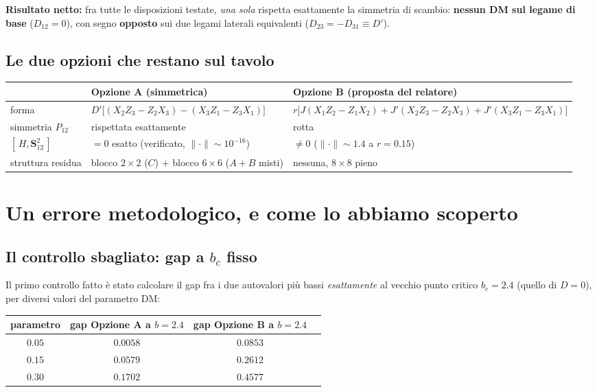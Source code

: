 \documentclass[11pt,a4paper]{article}
\begin{document}
\textbf{Risultato netto:} fra tutte le disposizioni testate, \emph{una sola} rispetta
esattamente la simmetria di scambio: \textbf{nessun DM sul legame di base}
($D_{12}=0$), con segno \textbf{opposto} sui due legami laterali equivalenti
($D_{23}=-D_{31}\equiv D'$).

\subsection{Le due opzioni che restano sul tavolo}

\begin{center}
\renewcommand{\arraystretch}{1.4}
\begin{tabular}{@{}p{2.3cm}p{6.3cm}p{6.3cm}@{}}
\toprule
& \textbf{Opzione A} (simmetrica) & \textbf{Opzione B} (proposta del relatore) \\
\midrule
forma & $D'\big[(X_2Z_3{-}Z_2X_3)-(X_3Z_1{-}Z_3X_1)\big]$ &
$r\big[J(X_1Z_2{-}Z_1X_2)+J'(X_2Z_3{-}Z_2X_3)+J'(X_3Z_1{-}Z_3X_1)\big]$ \\
simmetria $P_{12}$ & rispettata esattamente & rotta \\
$[\,H,\mathbf S_{12}^2\,]$ & $=0$ esatto (verificato, $\|\cdot\|\sim10^{-16}$) & $\neq0$
($\|\cdot\|\sim1.4$ a $r{=}0.15$) \\
struttura residua & blocco $2{\times}2$ ($C$) $+$ blocco $6{\times}6$ ($A{+}B$ misti) &
nessuna, $8\times8$ pieno \\
\bottomrule
\end{tabular}
\end{center}

\section{Un errore metodologico, e come lo abbiamo scoperto}

\subsection{Il controllo sbagliato: gap a $b_c$ fisso}

Il primo controllo fatto è stato calcolare il gap fra i due autovalori più bassi
\emph{esattamente} al vecchio punto critico $b_c=2.4$ (quello di $D=0$), per diversi
valori del parametro DM:

\begin{center}
\renewcommand{\arraystretch}{1.3}
\begin{tabular}{cccc}
\toprule
parametro & gap Opzione A a $b{=}2.4$ & gap Opzione B a $b{=}2.4$ \\
\midrule
$0.05$ & $0.0058$ & $0.0853$ \\
$0.15$ & $0.0579$ & $0.2612$ \\
$0.30$ & $0.1702$ & $0.4577$ \\
\bottomrule
\end{tabular}
\end{center}
\end{document}

